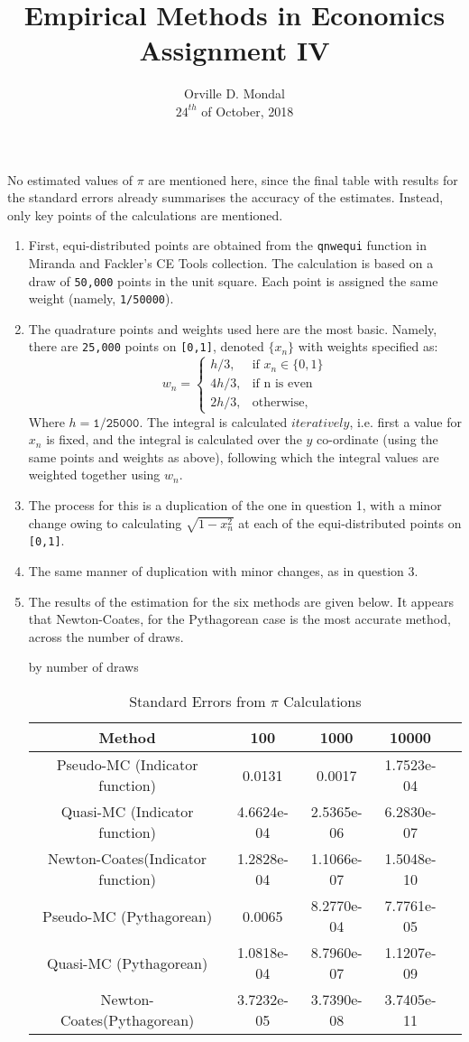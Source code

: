 \documentclass[12pt,a4paper]{article}
\title{Empirical Methods in Economics\\\small{Assignment IV}}
\date{Orville D. Mondal\\ $24^{th}$ of October, 2018\vspace{-3ex}}
\begin{document}
\maketitle
No estimated values of $\pi$ are mentioned here, since the final table with results for the standard errors already summarises the accuracy of the estimates. Instead, only key points of the calculations are mentioned.
\begin{enumerate}[(1)]
\item First, equi-distributed points are obtained from the \texttt{qnwequi} function in Miranda and Fackler's CE Tools collection. The calculation is based on a draw of \texttt{50,000} points in the unit square. Each point is assigned the same weight (namely, \texttt{1/50000}).
\item The quadrature points and weights used here are the most basic. Namely, there are \texttt{25,000} points on \texttt{[0,1]}, denoted $\{x_{n}\}$ with weights specified as:
\[w_{n}=
\begin{cases}
  h/3, & \mbox{if } x_{n}\in\{0,1\} \\
  4h/3, & \mbox{if } \text{n is even} \\
  2h/3, & \mbox{otherwise},
\end{cases}
\]
Where $h=\texttt{1/25000}$. The integral is calculated $iteratively$, i.e. first a value for $x_{n}$ is fixed, and the integral is calculated over the $y$ co-ordinate (using the same points and weights as above), following which the integral values are weighted together using $w_{n}$.
\item The process for this is a duplication of the one in question 1, with a minor change owing to calculating $\sqrt{1-x_n^{2}}$ at each of the equi-distributed points on \texttt{[0,1]}.
\item The same manner of duplication with minor changes, as in question 3.
\item The results of the estimation for the six methods are given below. It appears that Newton-Coates, for the Pythagorean case is the most accurate method, across the number of draws.
\begin{table}[h]
\caption{Standard Errors from $\pi$ Calculations} by number of draws\vspace{2mm}
\centering
\begin{tabular}{c c c c c}
\hline \hline\vspace{2mm}
Method &100 &1000 &10000 \\
\hline
Pseudo-MC (Indicator function)&0.0131&0.0017&1.7523e-04\\
Quasi-MC (Indicator function)&4.6624e-04&2.5365e-06&6.2830e-07\\
Newton-Coates(Indicator function)&1.2828e-04&1.1066e-07&1.5048e-10\\
Pseudo-MC (Pythagorean)&0.0065&8.2770e-04&7.7761e-05\\
Quasi-MC (Pythagorean)&1.0818e-04&8.7960e-07&1.1207e-09\\
Newton-Coates(Pythagorean)&3.7232e-05&3.7390e-08&3.7405e-11
\end{tabular}
\end{table}
\end{enumerate}
\end{document}
